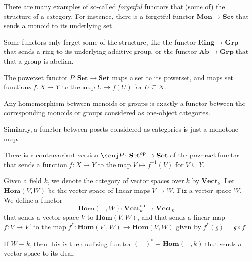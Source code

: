 \documentclass[article, a4paper, 11pt, oneside]{memoir}
\numberwithin{equation}{chapter}
\newcommand{\ncat}[1]{\mathbf{#1}} %
\newcommand{\catSet}{\ncat{Set}}
\newcommand{\catGrp}{\ncat{Grp}}
\newcommand{\catAb}{\ncat{Ab}}
\newcommand{\catMon}{\ncat{Mon}}
\newcommand{\catRing}{\ncat{Ring}}
\newcommand{\catVect}{\ncat{Vect}}
\newcommand{\op}{\mathrm{op}}
\theoremstyle{myexample}
\theoremstyle{myexamplebreak}
\begin{document}
\begin{examplebreak}
    \begin{enumexample}
        \item There are many examples of so-called \emph{forgetful} functors that  (some of) the structure of a category. For instance, there is a forgetful functor $\catMon \to \catSet$ that sends a monoid to its underlying set.
        
        Some functors only forget some of the structure, like the functor $\catRing \to \catGrp$ that sends a ring to its underlying additive group, or the functor $\catAb \to \catGrp$ that  that a group is abelian.

        \item The powerset functor $P \colon \catSet \to \catSet$ maps a set to its powerset, and maps set functions $f \colon X \to Y$ to the map $U \mapsto f(U)$ for $U \subseteq X$.
        
        \item Any homomorphism between monoids or groups is exactly a functor between the corresponding monoids or groups considered as one-object categories.
        
        Similarly, a functor between posets considered as categories is just a monotone map.
    \end{enumexample}
\end{examplebreak}

\renewcommand{\hom}{\mathbf{Hom}}
\newcommand{\blank}{-}

\begin{examplebreak}
    \begin{enumexample}
        \item There is a contravariant version $\conj P \colon \catSet^\op \to \catSet$ of the powerset functor that sends a function $f \colon X \to Y$ to the map $V \mapsto f^{-1}(V)$ for $V \subseteq Y$.
    
        \item Given a field $k$, we denote the category of vector spaces over $k$ by $\catVect_k$. Let $\hom(V,W)$ be the vector space of linear maps $V \to W$. Fix a vector space $W$. We define a functor
        \begin{equation*}
            \hom(\blank,W) \colon \catVect_k^\op \to \catVect_k
        \end{equation*}
        that sends a vector space $V$ to $\hom(V,W)$, and that sends a linear map $f \colon V \to V'$ to the map $f^* \colon \hom(V',W) \to \hom(V,W)$ given by $f^*(g) = g \circ f$.
        
        If $W = k$, then this is the dualising functor $(\blank)^* = \hom(\blank,k)$ that sends a vector space to its dual.
    \end{enumexample}
\end{examplebreak}
\end{document}
